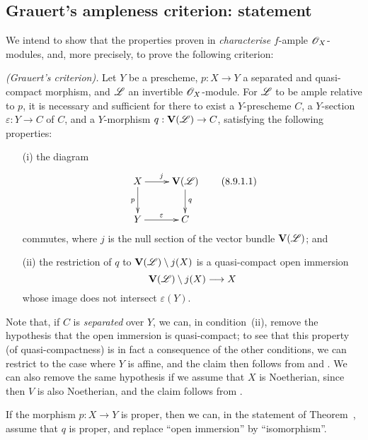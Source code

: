 \subsection{Grauert's ampleness criterion: statement}
\label{subsection:II.8.9}

We intend to show that the properties proven in  \emph{characterise} $f$-ample $\mathscr{O}_X$-modules, and, more precisely, to prove the following criterion:
\begin{theorem}[8.9.1]
\label{II.8.9.1}
\emph{(Grauert's criterion).}
Let $Y$ be a prescheme, $p:X\to Y$ a separated and quasi-compact morphism, and $\mathscr{L}$ an invertible $\mathscr{O}_X$-module.
For $\mathscr{L}$ to be ample relative to $p$, it is necessary and sufficient for there to exist a $Y$-prescheme $C$, a $Y$-section $\varepsilon:Y\to C$ of $C$, and a $Y$-morphism $q:\bb{V}(\sh{L})\to C$, satisfying the following properties:
\begin{enumerate}
  \item[\rm{(i)}] the diagram
    \[
      \label{II.8.9.1.1}
        \xymatrix{
          X
            \ar[r]^{j}
            \ar[d]_{p}
        & \bb{V}(\sh{L})
            \ar[d]^{q}
        \\Y
            \ar[r]^{\varepsilon}
        & C
        }
      \tag{8.9.1.1}
    \]
    commutes, where $j$ is the null section of the vector bundle $\mathbf{V}(\mathscr{L})$; and
  \item[\rm{(ii)}] the restriction of $q$ to $\mathbf{V}(\mathscr{L})\setminus j(X)$ is a quasi-compact open immersion
    \[
      \bb{V}(\sh{L})\setminus j(X) \to X
    \]
    whose image does not intersect $\varepsilon(Y)$.
\end{enumerate}
\end{theorem}

Note that, if $C$ is \emph{separated} over $Y$, we can, in condition~(ii), remove the hypothesis that the open immersion is quasi-compact;
to see that this property (of quasi-compactness) is in fact a consequence of the other conditions, we can restrict to the case where $Y$ is affine, and the claim then follows from  and .
We can also remove
the same hypothesis if we assume that $X$ is Noetherian, since then $V$ is also Noetherian, and the claim follows from .

\begin{corollary}[8.9.2]
\label{II.8.9.2}
If the morphism $p:X\to Y$ is proper, then we can, in the statement of Theorem~, assume that $q$ is proper, and replace ``open immersion'' by ``isomorphism''.
\end{corollary}

